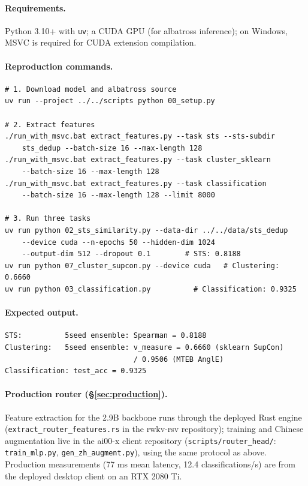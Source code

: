 \documentclass[11pt]{article}
\begin{document}
\paragraph{Requirements.} Python 3.10+ with \texttt{uv}; a CUDA GPU (for
albatross inference); on Windows, MSVC is required for CUDA extension
compilation.

\paragraph{Reproduction commands.}

\begin{verbatim}
# 1. Download model and albatross source
uv run --project ../../scripts python 00_setup.py

# 2. Extract features
./run_with_msvc.bat extract_features.py --task sts --sts-subdir
    sts_dedup --batch-size 16 --max-length 128
./run_with_msvc.bat extract_features.py --task cluster_sklearn
    --batch-size 16 --max-length 128
./run_with_msvc.bat extract_features.py --task classification
    --batch-size 16 --max-length 128 --limit 8000

# 3. Run three tasks
uv run python 02_sts_similarity.py --data-dir ../../data/sts_dedup
    --device cuda --n-epochs 50 --hidden-dim 1024
    --output-dim 512 --dropout 0.1        # STS: 0.8188
uv run python 07_cluster_supcon.py --device cuda   # Clustering: 0.6660
uv run python 03_classification.py          # Classification: 0.9325
\end{verbatim}

\paragraph{Expected output.}
\begin{verbatim}
STS:          5seed ensemble: Spearman = 0.8188
Clustering:   5seed ensemble: v_measure = 0.6660 (sklearn SupCon)
                              / 0.9506 (MTEB AnglE)
Classification: test_acc = 0.9325
\end{verbatim}

\paragraph{Production router (\S\ref{sec:production}).}
Feature extraction for the 2.9B backbone runs through the deployed Rust
engine (\texttt{extract\_router\_features.rs} in the rwkv-rsv repository);
training and Chinese augmentation live in the ai00-x client repository
(\texttt{scripts/router\_head/}: \texttt{train\_mlp.py},
\texttt{gen\_zh\_augment.py}), using the same protocol as above. Production
measurements (77 ms mean latency, 12.4 classifications/s) are from the
deployed desktop client on an RTX 2080 Ti.
\end{document}

